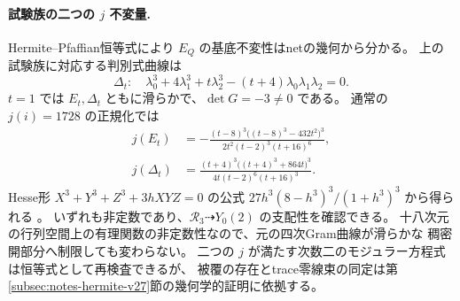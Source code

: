 \paragraph{試験族の二つの $j$ 不変量.}
Hermite--Pfaffian恒等式により $E_Q$ の基底不変性はnetの幾何から分かる。
上の試験族に対応する判別式曲線は
\[
 \Delta_t:\quad\lambda_0^3+4\lambda_1^3+t\lambda_2^3
 -(t+4)\lambda_0\lambda_1\lambda_2=0.
\]
$t=1$ では $E_t,\Delta_t$ ともに滑らかで、$\det G=-3\ne0$ である。
通常の $j(i)=1728$ の正規化では
\begin{align*}
 j(E_t)&=-\frac{(t-8)^3\bigl((t-8)^3-432t^2\bigr)^3}
 {2t^2(t-2)^3(t+16)^6},\\
 j(\Delta_t)&=\frac{(t+4)^3\bigl((t+4)^3+864t\bigr)^3}
 {4t(t-2)^6(t+16)^3}.
\end{align*}
Hesse形 $X^3+Y^3+Z^3+3hXYZ=0$ の公式
$27h^3(8-h^3)^3/(1+h^3)^3$ から得られる
\cite[\S2]{ArtebaniDolgachevHesse}。
いずれも非定数であり、$\mathcal R_3\dashrightarrow Y_0(2)$ の支配性を確認できる。
十八次元の行列空間上の有理関数の非定数性なので、元の四次Gram曲線が滑らかな
稠密開部分へ制限しても変わらない。
二つの $j$ が満たす次数二のモジュラー方程式は恒等式として再検査できるが、
被覆の存在とtrace零線束の同定は第\ref{subsec:notes-hermite-v27}節の幾何学的証明に依拠する。
